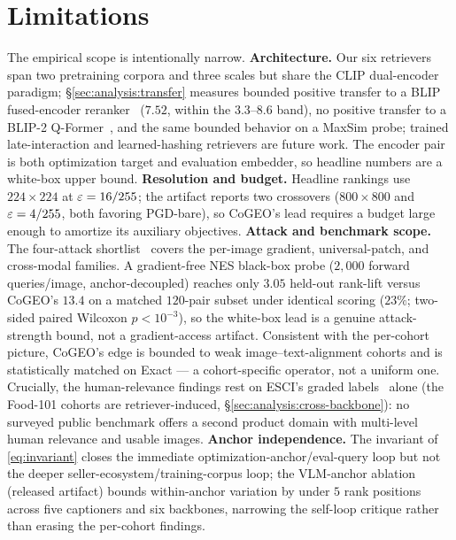 \section{Limitations}
\label{sec:limitations}

The empirical scope is intentionally narrow. \textbf{Architecture.} Our six retrievers~\cite{radford2021clip,cherti2023reproducible,fang2023eva02,zhai2023siglip} span two pretraining corpora and three scales but share the CLIP dual-encoder paradigm; \S\ref{sec:analysis:transfer} measures bounded positive transfer to a BLIP fused-encoder reranker~\cite{li2022blip} ($7.52$, within the $3.3$--$8.6$ band), no positive transfer to a BLIP-2 Q-Former~\cite{li2023blip2}, and the same bounded behavior on a MaxSim probe; trained late-interaction and learned-hashing retrievers are future work. The encoder pair is both optimization target and evaluation embedder, so headline numbers are a white-box upper bound. \textbf{Resolution and budget.} Headline rankings use $224 \times 224$ at $\varepsilon = 16/255$; the artifact reports two crossovers ($800 \times 800$ and $\varepsilon = 4/255$, both favoring PGD-bare), so CoGEO's lead requires a budget large enough to amortize its auxiliary objectives. \textbf{Attack and benchmark scope.} The four-attack shortlist~\cite{madry2018pgd,zhou2023advclip,zhang2022coattack,moosavidezfooli2017uap} covers the per-image gradient, universal-patch, and cross-modal families. A gradient-free NES black-box probe ($2{,}000$ forward queries/image, anchor-decoupled) reaches only $3.05$ held-out rank-lift versus CoGEO's $13.4$ on a matched $120$-pair subset under identical scoring ($23\%$; two-sided paired Wilcoxon $p<10^{-3}$), so the white-box lead is a genuine attack-strength bound, not a gradient-access artifact. Consistent with the per-cohort picture, CoGEO's edge is bounded to weak image--text-alignment cohorts and is statistically matched on Exact --- a cohort-specific operator, not a uniform one. Crucially, the human-relevance findings rest on ESCI's graded labels~\cite{reddy2022esci} alone (the Food-101 cohorts are retriever-induced, \S\ref{sec:analysis:cross-backbone}): no surveyed public benchmark offers a second product domain with multi-level human relevance and usable images. \textbf{Anchor independence.} The invariant of \eqref{eq:invariant} closes the immediate optimization-anchor/eval-query loop but not the deeper seller-ecosystem/training-corpus loop; the VLM-anchor ablation (released artifact) bounds within-anchor variation by under $5$ rank positions across five captioners and six backbones, narrowing the self-loop critique rather than erasing the per-cohort findings.

